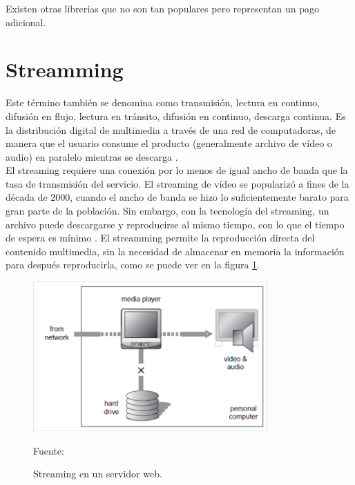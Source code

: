 Existen otras librerias que no son tan populares pero representan un pago adicional.

\section{Streamming}
Este término también se denomina como transmisión, lectura en continuo, difusión en flujo, lectura en tránsito, difusión en continuo, descarga continua. Es la distribución digital de multimedia a través de una red de computadoras, de manera que el usuario consume el producto (generalmente archivo de vídeo o audio) en paralelo mientras se descarga \cite{streamming:austerberry}.\\

El streaming requiere una conexión por lo menos de igual ancho de banda que la tasa de transmisión del servicio. El streaming de vídeo se popularizó a fines de la década de 2000, cuando el ancho de banda se hizo lo suficientemente barato para gran parte de la población. Sin embargo, con la tecnología del streaming, un archivo puede descargarse y reproducirse al mismo tiempo, con lo que el tiempo de espera es mínimo \cite{streamming:austerberry}. El streamming permite la reproducción directa del contenido multimedia, sin la necesidad de almacenar en memoria la información para después reproducirla, como se puede ver en la figura \ref{fig:stream}.\\

\begin{figure}[H]
    \begin{center}
        \includegraphics[width=9cm]{img/capitulo_2/stream.png}
    \end{center}
    \begin{center}
        \caption{Streaming en un servidor web.}
        Fuente: \cite{streamming:austerberry}
        \label{fig:stream}
    \end{center}
\end{figure}

